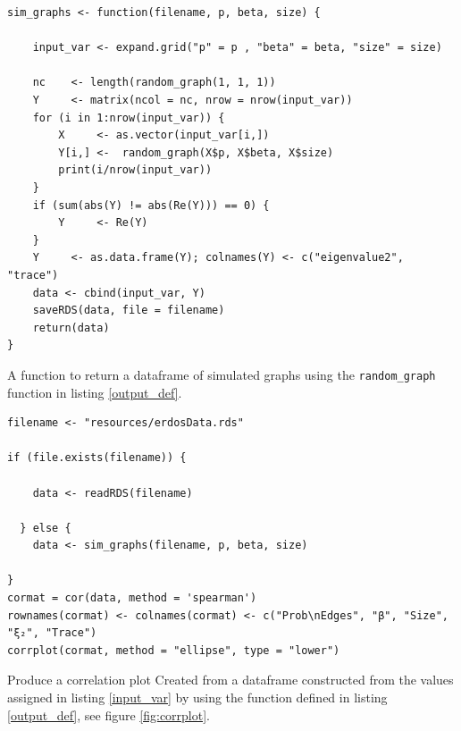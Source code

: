 \documentclass[11pt]{article}
\begin{document}
\begin{listing}[htbp]
\begin{verbatim}
sim_graphs <- function(filename, p, beta, size) {

    input_var <- expand.grid("p" = p , "beta" = beta, "size" = size)

    nc    <- length(random_graph(1, 1, 1))
    Y     <- matrix(ncol = nc, nrow = nrow(input_var))
    for (i in 1:nrow(input_var)) {
        X     <- as.vector(input_var[i,])
        Y[i,] <-  random_graph(X$p, X$beta, X$size)
        print(i/nrow(input_var))
    }
    if (sum(abs(Y) != abs(Re(Y))) == 0) {
        Y     <- Re(Y)
    }
    Y     <- as.data.frame(Y); colnames(Y) <- c("eigenvalue2", "trace")
    data <- cbind(input_var, Y)
    saveRDS(data, file = filename)
    return(data)
}
\end{verbatim}
\caption{\label{func-sim}A function to return a dataframe of simulated graphs using the \texttt{random\_graph} function in listing \ref{output_def}.}
\end{listing}

\begin{listing}[htbp]
\begin{verbatim}
filename <- "resources/erdosData.rds"

if (file.exists(filename)) {

    data <- readRDS(filename)

  } else {
    data <- sim_graphs(filename, p, beta, size)

}
cormat = cor(data, method = 'spearman')
rownames(cormat) <- colnames(cormat) <- c("Prob\nEdges", "β", "Size", "ξ₂", "Trace")
corrplot(cormat, method = "ellipse", type = "lower")
\end{verbatim}
\caption{\label{corrplot}Produce a correlation plot Created from a dataframe constructed from the values assigned in listing \ref{input_var} by using the function defined in listing \ref{output_def}, see figure \ref{fig:corrplot}.}
\end{listing}
\end{document}
